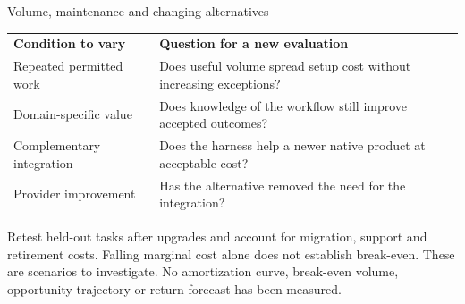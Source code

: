 \begin{frame}[label=durability]{Volume, maintenance and changing alternatives}
\begin{tabular}{p{.28\linewidth}p{.63\linewidth}}
\textbf{Condition to vary} & \textbf{Question for a new evaluation} \\
Repeated permitted work & Does useful volume spread setup cost without increasing exceptions? \\
Domain-specific value & Does knowledge of the workflow still improve accepted outcomes? \\
Complementary integration & Does the harness help a newer native product at acceptable cost? \\
Provider improvement & Has the alternative removed the need for the integration? \\
\end{tabular}
\par\medskip
Retest held-out tasks after upgrades and account for migration, support and
retirement costs. Falling marginal cost alone does not establish break-even.
\vfill
{\footnotesize These are scenarios to investigate. No amortization curve,
break-even volume, opportunity trajectory or return forecast has been measured.}
\end{frame}
